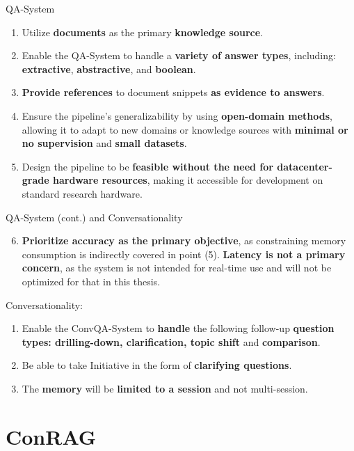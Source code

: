\documentclass{beamer}
\begin{document}
\begin{frame}{QA-System}
  \begin{enumerate}
    \item Utilize \textbf{documents} as the primary \textbf{knowledge source}.
    \item Enable the QA-System to handle a \textbf{variety of answer types}, including: \textbf{extractive}, \textbf{abstractive}, and \textbf{boolean}.
    \item \textbf{Provide references} to document snippets \textbf{as evidence to answers}.
    \item Ensure the pipeline's generalizability by using \textbf{open-domain methods}, allowing it to adapt to new domains or knowledge sources with \textbf{minimal or no supervision} and \textbf{small datasets}.
    \item Design the pipeline to be \textbf{feasible without the need for datacenter-grade hardware resources}, making it accessible for development on standard research hardware.
  \end{enumerate}
\end{frame}
  
\begin{frame}{QA-System (cont.) and Conversationality}
  \begin{enumerate}
    \setcounter{enumi}{5}
    \item \textbf{Prioritize accuracy as the primary objective}, as constraining memory consumption is indirectly covered in point (5). \textbf{Latency is not a primary concern}, as the system is not intended for real-time use and will not be optimized for that in this thesis.
  \end{enumerate}
  
  Conversationality:
  \begin{enumerate}
    \item Enable the ConvQA-System to \textbf{handle} the following follow-up \textbf{question types: drilling-down, clarification, topic shift} and \textbf{comparison}.
    \item Be able to take Initiative in the form of \textbf{clarifying questions}.
    \item The \textbf{memory} will be \textbf{limited to a session} and not multi-session.
  \end{enumerate}
\end{frame}

\section[ConRAG]{ConRAG}
\end{document}
